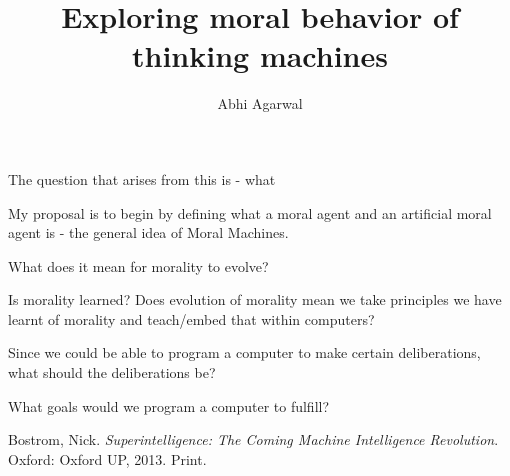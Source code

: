 \documentclass[11pt, oneside]{article}
\title{Exploring moral behavior of thinking machines}
\author{Abhi Agarwal}
\date{}
\begin{document}
\maketitle

\par The question that arises from this is - what 
\par My proposal is to begin by defining what a moral agent and an artificial moral agent is - the general idea of Moral Machines.
\par What does it mean for morality to evolve?
\par Is morality learned? Does evolution of morality mean we take principles we have learnt of morality and teach/embed that within computers?
\par Since we could be able to program a computer to make certain deliberations, what should the deliberations be?
\par What goals would we program a computer to fulfill?

\begin{thebibliography}{9}

  Bostrom, Nick. 
  \emph{Superintelligence: The Coming Machine Intelligence Revolution}.
  Oxford: Oxford UP, 2013. 
  Print.

\end{thebibliography}
\end{document}
